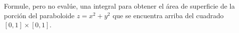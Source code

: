 \item Formule, pero no evalúe, una integral para obtener el área de superficie de la porción del paraboloide $z = x^2 + y^2$ que se encuentra arriba del cuadrado $[0, 1] \times [0, 1]$.
